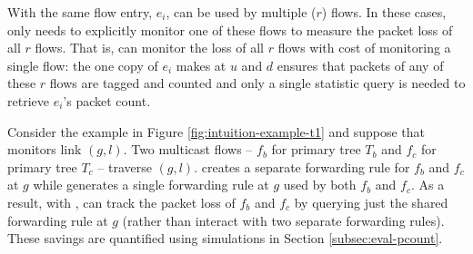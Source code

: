 
With \merge the same flow entry, $e_i$, can be used by multiple ($r$) flows.  In these cases, \pcnt only needs to explicitly monitor one of these flows to measure
the packet loss of all $r$ flows.  That is, \pcnt can monitor the loss of all $r$ flows with cost of monitoring a single flow:
the one copy of $e_i$ \pcnt makes at $u$ and $d$ ensures that packets of any of these $r$ flows are tagged and counted and
only a single statistic query is needed to retrieve $e_i$'s packet count.

Consider the example in Figure \ref{fig:intuition-example-t1} and suppose that \pcnt monitors link $(g,l)$. 
Two multicast flows -- $f_b$ for primary tree $T_b$ and $f_c$ for primary tree $T_c$ -- traverse
$(g,l)$.  \base creates a separate forwarding rule for $f_b$ and $f_c$ at $g$ while \merge generates a single forwarding rule at $g$ used by both $f_b$ and $f_c$.  As a result, 
with \merges, \pcnt can track the  packet loss of $f_b$ and $f_c$ by querying just the shared \merge forwarding rule at $g$ (rather than interact with two separate \base forwarding rules).
These savings are quantified using simulations in Section \ref{subsec:eval-pcount}.





